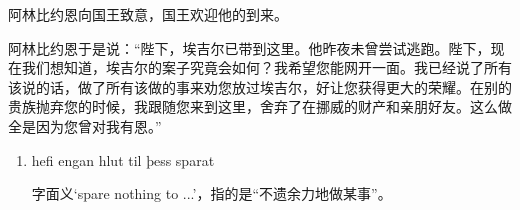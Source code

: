 \begin{translation*}{}
  阿林比约恩向国王致意，国王欢迎他的到来。

  阿林比约恩于是说：“陛下，埃吉尔已带到这里。他昨夜未曾尝试逃跑。陛下，现在我们想知道，埃吉尔的案子究竟会如何？我希望您能网开一面。我已经说了所有该说的话，做了所有该做的事来劝您放过埃吉尔，好让您获得更大的荣耀。在别的贵族抛弃您的时候，我跟随您来到这里，舍弃了在挪威的财产和亲朋好友。这么做全是因为您曾对我有恩。”
\end{translation*}
\begin{grammar*}{}
  \begin{enumerate}[leftmargin=*]
    \item hefi engan hlut til þess sparat

          字面义`spare nothing to ...'，指的是“不遗余力地做某事”。
  \end{enumerate}
\end{grammar*}

